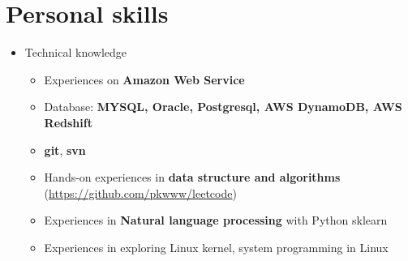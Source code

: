 \documentclass[a4paper,12pt]{article}
\begin{document}
  \section*{Personal skills}
  \begin{itemize}
    \item Technical knowledge
    \begin{itemize}
      \item Experiences on \textbf{Amazon Web Service}
      \item Database: \textbf{MYSQL, Oracle, Postgresql, AWS DynamoDB, AWS Redshift}
      \item \textbf{git}, \textbf{svn}
      \item Hands-on experiences in \textbf{data structure and algorithms} (\href{https://github.com/pkwww/leetcode}{https://github.com/pkwww/leetcode})
      \item Experiences in \textbf{Natural language processing} with Python sklearn
      \item Experiences in exploring Linux kernel, system programming in Linux
    \end{itemize}


\end{itemize}
\end{document}
